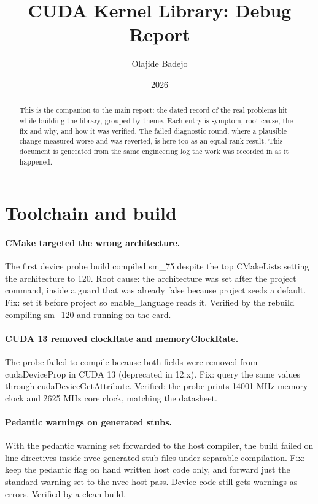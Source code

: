 \documentclass[11pt]{article}
\title{CUDA Kernel Library: Debug Report}
\author{Olajide Badejo}
\date{2026}
\begin{document}
\maketitle

\begin{abstract}
This is the companion to the main report: the dated record of the real problems
hit while building the library, grouped by theme. Each entry is symptom, root
cause, the fix and why, and how it was verified. The failed diagnostic round, where
a plausible change measured worse and was reverted, is here too as an equal rank
result. This document is generated from the same engineering log the work was
recorded in as it happened.
\end{abstract}

\newpage

\section{Toolchain and build}

\paragraph{CMake targeted the wrong architecture.} The first device probe build
compiled sm\_75 despite the top CMakeLists setting the architecture to 120. Root
cause: the architecture was set after the project command, inside a guard that was
already false because project seeds a default. Fix: set it before project so
enable\_language reads it. Verified by the rebuild compiling sm\_120 and running on
the card.

\paragraph{CUDA 13 removed clockRate and memoryClockRate.} The probe failed to
compile because both fields were removed from cudaDeviceProp in CUDA 13 (deprecated
in 12.x). Fix: query the same values through cudaDeviceGetAttribute. Verified: the
probe prints 14001 MHz memory clock and 2625 MHz core clock, matching the
datasheet.

\paragraph{Pedantic warnings on generated stubs.} With the pedantic warning set
forwarded to the host compiler, the build failed on line directives inside nvcc
generated stub files under separable compilation. Fix: keep the pedantic flag on
hand written host code only, and forward just the standard warning set to the nvcc
host pass. Device code still gets warnings as errors. Verified by a clean build.
\end{document}
